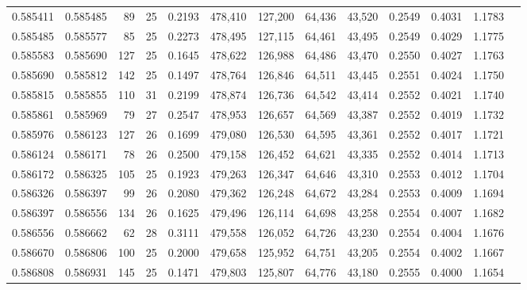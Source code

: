 \begin{tabular}{rrrrrrrrrrrrr}
0.585411 & 0.585485 &  89 &  25 &                                     0.2193 & 478,410 & 127,200 &  64,436 &  43,520 & 0.2549 & 0.4031 & 1.1783 \\
0.585485 & 0.585577 &  85 &  25 &                                     0.2273 & 478,495 & 127,115 &  64,461 &  43,495 & 0.2549 & 0.4029 & 1.1775 \\
0.585583 & 0.585690 & 127 &  25 &                                     0.1645 & 478,622 & 126,988 &  64,486 &  43,470 & 0.2550 & 0.4027 & 1.1763 \\
0.585690 & 0.585812 & 142 &  25 &                                     0.1497 & 478,764 & 126,846 &  64,511 &  43,445 & 0.2551 & 0.4024 & 1.1750 \\
0.585815 & 0.585855 & 110 &  31 &                                     0.2199 & 478,874 & 126,736 &  64,542 &  43,414 & 0.2552 & 0.4021 & 1.1740 \\
0.585861 & 0.585969 &  79 &  27 &                                     0.2547 & 478,953 & 126,657 &  64,569 &  43,387 & 0.2552 & 0.4019 & 1.1732 \\
0.585976 & 0.586123 & 127 &  26 &                                     0.1699 & 479,080 & 126,530 &  64,595 &  43,361 & 0.2552 & 0.4017 & 1.1721 \\
0.586124 & 0.586171 &  78 &  26 &                                     0.2500 & 479,158 & 126,452 &  64,621 &  43,335 & 0.2552 & 0.4014 & 1.1713 \\
0.586172 & 0.586325 & 105 &  25 &                                     0.1923 & 479,263 & 126,347 &  64,646 &  43,310 & 0.2553 & 0.4012 & 1.1704 \\
0.586326 & 0.586397 &  99 &  26 &                                     0.2080 & 479,362 & 126,248 &  64,672 &  43,284 & 0.2553 & 0.4009 & 1.1694 \\
0.586397 & 0.586556 & 134 &  26 &                                     0.1625 & 479,496 & 126,114 &  64,698 &  43,258 & 0.2554 & 0.4007 & 1.1682 \\
0.586556 & 0.586662 &  62 &  28 &                                     0.3111 & 479,558 & 126,052 &  64,726 &  43,230 & 0.2554 & 0.4004 & 1.1676 \\
0.586670 & 0.586806 & 100 &  25 &                                     0.2000 & 479,658 & 125,952 &  64,751 &  43,205 & 0.2554 & 0.4002 & 1.1667 \\
0.586808 & 0.586931 & 145 &  25 &                                     0.1471 & 479,803 & 125,807 &  64,776 &  43,180 & 0.2555 & 0.4000 & 1.1654 \\

\end{tabular}
